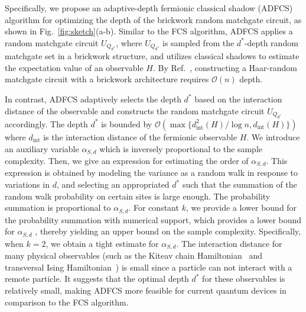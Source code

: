 \documentclass[showpacs,twocolumn,aps,prx,long bibliography,superscriptaddress,notitlepage]{revtex4-1}
\newcommand{\cbra}[1]{\{ #1 \}}
\newcommand{\Ord}[1]{\mathcal{O}\left( #1 \right)}
\begin{document}
Specifically, we propose an adaptive-depth fermionic classical shadow (ADFCS) algorithm for optimizing the depth of the brickwork random matchgate circuit, as shown in Fig.~\ref{fig:sketch}(a-b). 
Similar to the FCS algorithm, ADFCS applies a random matchgate circuit $U_{Q_{d^\ast}}$, where $U_{Q_{d^\ast}}$ is sampled from the $d^\ast$-depth random matchgate set in a brickwork structure, and utilizes classical shadows to estimate the expectation value of an observable $H$. 
By Ref.~\cite{Jiang18Quantum}, constructing a Haar-random matchgate circuit with a brickwork architecture requires $\mathcal{O}(n)$ depth. 

In contrast, ADFCS adaptively selects the depth $d^\ast$ based on the interaction distance of the observable and constructs the random matchgate circuit $U_{Q_{d^\ast}}$ accordingly.
The depth $d^\ast$ is {bounded by} $\Ord{\max\cbra{d^2_{\text{int}}(H)/\log n, d_{\text{int}}(H)}}$ where $d_{\text{int}}$ is the interaction distance of the fermionic observable $H$. 
We introduce an auxiliary variable $\alpha_{S,d}$ which is inversely proportional to the sample complexity. Then, we give an expression for estimating the order of $\alpha_{S,d}$.
This expression is obtained by modeling the variance as a random walk in response to variations in $d$, and selecting an appropriated $d^\ast$ such that the summation of the random walk probability on certain sites is large enough. 
The probability summation is proportional to $\alpha_{S,d}$.
For constant \( k \), we provide a lower bound for the probability summation with numerical support, which provides a lower bound for $\alpha_{S,d}$ , thereby yielding an upper bound on the sample complexity. Specifically, when \( k = 2 \), we obtain a tight estimate for \( \alpha_{S,d} \).
The interaction distance for many physical observables (such as the Kiteav chain Hamiltonian~\cite{greiter20141d, borla2021gauging} and transversal Ising Hamiltonian~\cite{greiter20141d, marsolais2021equivalence}) is small since a particle can not interact with a remote particle. It suggests that the optimal depth $d^\ast$ for these observables is relatively small, making ADFCS more feasible for current quantum devices in comparison to the FCS algorithm. 


\end{document}
